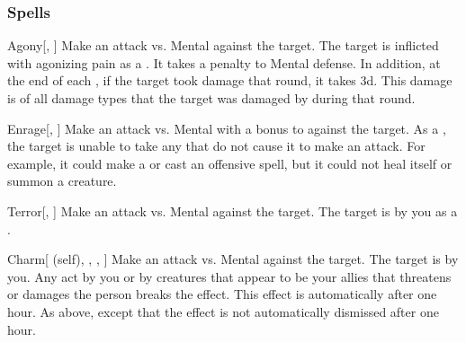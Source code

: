 \subsubsection{Spells}


\lowercase{\hypertarget{spell:Agony}{}}\label{spell:Agony}
\begin{freeability}[\nth{1}]{\hypertarget{spell:Agony}{Agony}}[, ]
Make an attack vs. Mental against the target.
\hit The target is inflicted with agonizing pain as a .
It takes a  penalty to Mental defense.
In addition, at the end of each , if the target took damage that round, it takes  \minus3d.
This damage is of all damage types that the target was damaged by during that round.
\end{freeability}
\vspace{0.25em}



\lowercase{\hypertarget{spell:Enrage}{}}\label{spell:Enrage}
\begin{freeability}[\nth{1}]{\hypertarget{spell:Enrage}{Enrage}}[, ]
Make an attack vs. Mental with a  bonus to  against the target.
\hit As a , the target is unable to take any  that do not cause it to make an attack.
For example, it could make a  or cast an offensive spell, but it could not heal itself or summon a creature.
\end{freeability}
\vspace{0.25em}



\lowercase{\hypertarget{spell:Terror}{}}\label{spell:Terror}
\begin{freeability}[\nth{1}]{\hypertarget{spell:Terror}{Terror}}[, ]
Make an attack vs. Mental against the target.
\hit The target is \frightened by you as a .
\end{freeability}
\vspace{0.25em}



\lowercase{\hypertarget{spell:Charm}{}}\label{spell:Charm}
\begin{attuneability}[\nth{2}]{\hypertarget{spell:Charm}{Charm}}[ (self), , , ]
Make an attack vs. Mental against the target.
\hit The target is \charmed by you.
Any act by you or by creatures that appear to be your allies that threatens or damages the  person breaks the effect.
This effect is automatically  after one hour.
\crit As above, except that the effect is not automatically dismissed after one hour.
\end{attuneability}
\vspace{0.25em}



